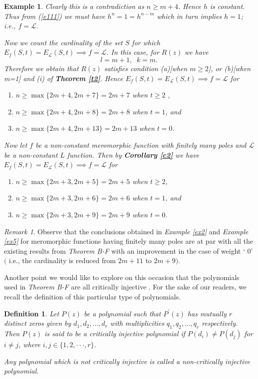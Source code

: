 \documentclass[a4paper,draft]{amsproc}
\theoremstyle{plain}
\newtheorem{exm}{Example}[section]
\newtheorem{defi}{Definition}[section]
\theoremstyle{definition}
\theoremstyle{remark}
\newtheorem{rem}{Remark}[section]
\numberwithin{equation}{section}
\begin{document}
\begin{exm}
	Clearly this is a contradiction as $n\geq m+4$. Hence  $h$ is  constant. Thus from (\ref{e111}) we must have  $h^{n}=1=h^{n-m}$ which in turn implies $h=1$; i.e., $f=\mathcal{L}$. \vspace{0.1in}\par Now we count the cardinality of the set $S$ for which  $E_f(S, t)=E_\mathcal{L}(S,t)\implies f=\mathcal{L}$. In this case, for $R(z)$ we have  $$l=m+1,\;\; k=m.$$  Therefore we obtain that $R(z)$ satisfies condition (a)[when $m\geq2$], or (b)[when m=1] and (i)  of
	{\em\bf Theorem \ref{t2}}. Hence  $E_f(S, t)=E_\mathcal{L}(S,t)\implies f=\mathcal{L}$ for \begin{enumerate}
		\item $n\geq \max\{2m+4,2m+7\}=2m+7$ when $t\geq 2$ ,
		\item $n\geq \max\{2m+4,2m+8\}=2m+8$ when $t= 1$, and 
		\item $n\geq \max\{2m+4,2m+13\}=2m+13$ when $t=0$.
	\end{enumerate}
	Now let $f$ be a non-constant meromorphic function with finitely many poles and $\mathcal{L}$ be a non-constant $L$ function. Then by {\em\bf Corollary \ref{c2}} we have $E_f(S, t)=E_\mathcal{L}(S,t)\implies f=\mathcal{L}$ for  
	\begin{enumerate}
		\item $n \geq \max\{ 2m+3,2m+5\}=2m+5$ when $t\geq 2 $,
		\item  $n \geq \max\{ 2m+3,2m+6\}=2m+6$ when $t=1 $, and
		\item  $n \geq \max\{ 2m+3,2m+9\}=2m+9$ when $t=0 $.
	\end{enumerate} 		
\end{exm} 	
\begin{rem}
	Observe that the conclusions obtained in {\em Example \ref{ex2}} and {\em Example \ref{ex5}} for meromorphic functions having finitely many poles are at par with all the existing results from {\em Theorem B-F} with an improvement in the case of weight ` $0$' $($ i.e., the cardinality is reduced from $2m+11$ to $2m+9)$.
\end{rem}
Another point we would like to explore on this occasion that the polynomials used in {\em Theorem B-F} are all critically injective \cite[see Lemma 4]{bk}. For the sake of our readers, we recall the definition of this particular type of polynomials. 
\begin{defi}
	Let $P(z)$ be a polynomial such that $P^{\prime}(z)$ has mutually $r$ distinct  zeros given by $d_{1}, d_{2}, \ldots, d_{r}$ with multiplicities $q_{1}, q_{2}, \ldots, q_{r}$ respectively. Then $P(z)$ is said to be a critically injective polynomial if $P(d_i)\not =P(d_j)$ for $i\not=j$, where $i,j\in \{1,2,\cdot\cdot\cdot,r\}$.
	\par 	Any polynomial which is not critically injective is called a non-critically injective polynomial.
\end{defi}
\end{document}
